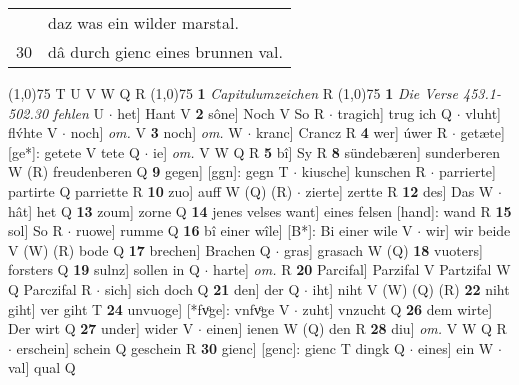\documentclass[8pt,a4paper,notitlepage]{article}
\begin{document}
\begin{table}[ht]
\begin{minipage}[t]{0.5\linewidth}
\begin{tabular}{rl}
 & daz was ein wilder marstal.\\ 
30 & dâ durch gienc eines brunnen val.\\ 
\end{tabular}
\scriptsize
\line(1,0){75} \newline
T U V W Q R \newline
\line(1,0){75} \newline
\textbf{1} \textit{Capitulumzeichen} R  \newline
\line(1,0){75} \newline
\textbf{1} \textit{Die Verse 453.1-502.30 fehlen} U   $\cdot$ het] Hant V \textbf{2} sône] Noch V So R  $\cdot$ tragich] trug ich Q  $\cdot$ vluht] flv́hte V  $\cdot$ noch] \textit{om.} V \textbf{3} noch] \textit{om.} W  $\cdot$ kranc] Crancz R \textbf{4} wer] úwer R  $\cdot$ getæte] [ge*]: getete V tete Q  $\cdot$ ie] \textit{om.} V W Q R \textbf{5} bî] Sy R \textbf{8} sündebæren] sunderberen W (R) freudenberen Q \textbf{9} gegen] [ggn]: gegn T  $\cdot$ kiusche] kunschen R  $\cdot$ parrierte] partirte Q parriette R \textbf{10} zuo] auff W (Q) (R)  $\cdot$ zierte] zertte R \textbf{12} des] Das W  $\cdot$ hât] het Q \textbf{13} zoum] zorne Q \textbf{14} jenes velses want] eines felsen [hand]: wand R \textbf{15} sol] So R  $\cdot$ ruowe] rumme Q \textbf{16} bî einer wîle] [B*]: Bi einer wile V  $\cdot$ wir] wir beide V (W) (R) bode Q \textbf{17} brechen] Brachen Q  $\cdot$ gras] grasach W (Q) \textbf{18} vuoters] forsters Q \textbf{19} sulnz] sollen in Q  $\cdot$ harte] \textit{om.} R \textbf{20} Parcifal] Parzifal V Partzifal W Q Parczifal R  $\cdot$ sich] sich doch Q \textbf{21} den] der Q  $\cdot$ iht] niht V (W) (Q) (R) \textbf{22} niht giht] ver giht T \textbf{24} unvuoge] [*fvͦge]: vnfvͦge V  $\cdot$ zuht] vnzucht Q \textbf{26} dem wirte] Der wirt Q \textbf{27} under] wider V  $\cdot$ einen] ienen W (Q) den R \textbf{28} diu] \textit{om.} V W Q R  $\cdot$ erschein] schein Q geschein R \textbf{30} gienc] [genc]: gienc T dingk Q  $\cdot$ eines] ein W  $\cdot$ val] qual Q \newline
\end{minipage}
\end{table}
\end{document}
